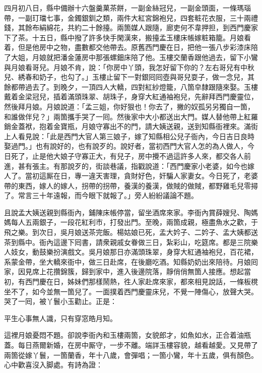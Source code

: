 四月初八日，縣中備辦十六盤羹菓茶餅，一副金絲冠兒，一副金頭面，一條瑪瑙帶，一副玎璫七事，金鐲銀釧之類，兩件大紅宮錦袍兒，四套粧花衣服，三十兩禮錢，其餘布絹綿花，共約二十餘擡。兩箇媒人跟隨，廊吏何不韋押担，到西門慶家下了茶。十五日，縣中撥了許多快手閑漢來，搬擡孟玉樓床帳嫁粧箱籠。月娘看着，但是他房中之物，盡數都交他帶去。原舊西門慶在日，把他一張八步彩漆床陪了大姐，月娘就把潘金蓮房中那張螺鈿床陪了他。{}玉樓交蘭香跟他過去，留下小鸞與月娘看哥兒。月娘不肯，說：「你房中丫頭，我怎好留下你的？左右哥兒有中秋兒、綉春和奶子，也勾了。」玉樓止留下一對銀囘囘壺與哥兒耍子，做一念兒，其餘都帶過去了。到晚夕，一頂四人大轎，四對紅紗燈籠，八箇皁隸跟隨來娶。玉樓戴着金梁冠兒，插着滿頭珠翠、胡珠子，身穿大紅通袖袍兒，先辭拜西門慶靈位，{}然後拜月娘。月娘說道：「孟三姐，你好狠也！你去了，撇的奴孤另另獨自一箇，和誰做伴兒？」{}兩箇攜手哭了一囘。然後家中大小都送出大門。媒人替他帶上紅羅銷金蓋袱，抱着金寶瓶，月娘守寡出不的門，請大姨送親，送到知縣衙裡來。滿街上人看見說：「此是西門大官人第三娘子，嫁了知縣相公兒子衙內，今日吉日良時娶過門。」也有說好的，也有說歹的。說好者，當初西門大官人怎的為人做人，今日死了，止是他大娘子守寡正大，有兒子，房中攪不過這許多人來，都交各人前進，甚有張主。有那說歹的，街談巷議，指戳說道：「西門慶家小老婆，如今也嫁人了。當初這厮在日，專一違天害理，貪財好色，奸騙人家妻女。今日死了，老婆帶的東西，嫁人的嫁人，拐帶的拐帶，養漢的養漢，做賊的做賊，都野雞毛兒零撏了。常言三十年遠報，而今眼下就報了。」旁人紛紛議論不題。{}

且說孟大姨送親到縣衙內，鋪陳床帳停當，留坐酒席來家。李衙內賞薛嫂兒、陶媽媽每人五兩銀子，一段花紅利市，打發出門。至晚，兩箇成親，極盡魚水之歡，于飛之樂。到次日，吳月娘送茶完飯。楊姑娘已死，孟大妗子、二妗子、孟大姨都送茶到縣中。衙內這邊下囘書，請衆親戚女眷做三日，紮彩山，吃筵席。都是三院樂人妓女，動鼓樂扮演戲文。吳月娘那日亦滿頭珠翠，身穿大紅通袖袍兒，百花裙，系蒙金帶，坐大轎來衙中，做三日赴席，在後廳吃酒。知縣奶奶出來陪待。月娘囘家，因見席上花攢錦簇，歸到家中，進入後邊院落，靜俏俏無箇人接應。想起當初，有西門慶在日，姊妹們那樣鬧熱，徃人家赴席來家，都來相見說話，一條板櫈坐不了，如今並無一箇兒了。一面撲着西門慶靈床兒，不覺一陣傷心，放聲大哭。{}哭了一囘，被丫鬟小玉勸止。正是：

\begin{myquote}
平生心事無人識，只有穿窓皓月知。
\end{myquote}

這裡月娘憂悶不題。卻說李衙內和玉樓兩箇，女貌郎才，如魚如水，正合着油瓶蓋。每日燕爾新婚，在房中厮守，一步不離。{}端詳玉樓容貌，越看越愛。又見帶了兩箇從嫁丫鬟，一箇蘭香，年十八歲，會彈唱；一箇小鸞，年十五歲，俱有顏色。心中歡喜沒入脚處。有詩為證：


